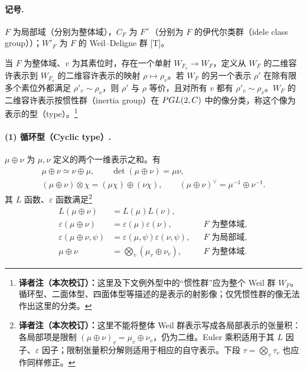 \paragraph*{记号.}
$F$ 为局部域（分别为整体域），$C_F$ 为 $F^\times$（分别为 $F$ 的伊代尔类群（idele class group））；$W'_F$ 为 $F$ 的 Weil--Deligne 群 [T]。

当 $F$ 为整体域、$v$ 为其素位时，存在一个单射 $W_{F_v}\to W_F$，定义从 $W_F$ 的二维容许表示到 $W_{F_v}$ 的二维容许表示的映射 $\rho\mapsto\rho_v$。若 $W_F$ 的另一个表示 $\rho'$ 在除有限多个素位外都满足 $\rho'_v\sim\rho_v$，则 $\rho'$ 与 $\rho$ 等价，且对所有 $v$ 都有 $\rho'_v\sim\rho_v$。$W_F$ 的二维容许表示按惯性群（inertia group）在 $PGL(2,C)$ 中的像分类，称这个像为表示的型（type）。\footnote{\textbf{译者注（本次校订）：}这里及下文例外型中的“惯性群”应为整个 Weil 群 $W_F$。循环型、二面体型、四面体型等描述的是表示的射影像；仅凭惯性群的像无法作出这里的分类。}

\paragraph*{(1) 循环型（Cyclic type）.}
$\mu\oplus\nu$ 为 $\mu,\nu$ 定义的两个一维表示之和。有
\[
 \begin{gathered}
 \mu\oplus\nu\simeq\nu\oplus\mu,\qquad\det(\mu\oplus\nu)=\mu\nu,\\
 (\mu\oplus\nu)\otimes\chi=(\mu\chi)\oplus(\nu\chi),
 \qquad(\mu\oplus\nu)^\vee=\mu^{-1}\oplus\nu^{-1}.
 \end{gathered}
\]
其 $L$ 函数、$\varepsilon$ 函数满足\footnote{\textbf{译者注（本次校订）：}这里不能将整体 Weil 群表示写成各局部表示的张量积：各局部项是限制 $(\mu\oplus\nu)_v=\mu_v\oplus\nu_v$，仍为二维。Euler 乘积适用于其 $L$ 因子、$\varepsilon$ 因子；限制张量积分解则适用于相应的自守表示。下段 $\tau=\bigotimes_v\tau_v$ 也应作同样修正。}
\[
 \begin{aligned}
 L(\mu\oplus\nu)&=L(\mu)L(\nu),\\
 \varepsilon(\mu\oplus\nu)&=\varepsilon(\mu)\varepsilon(\nu),&&F\text{ 为整体域},\\
 \varepsilon(\mu\oplus\nu,\psi)&=\varepsilon(\mu,\psi)\varepsilon(\nu,\psi),&&F\text{ 为局部域},\\
 \mu\oplus\nu&=\bigotimes_v(\mu_v\oplus\nu_v),&&F\text{ 为整体域}.
 \end{aligned}
\]

